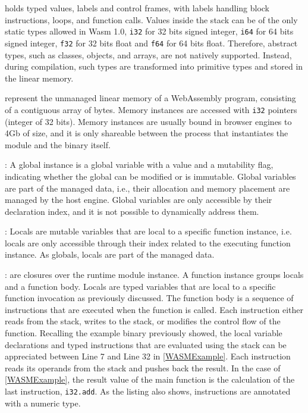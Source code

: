  holds typed values, labels and control frames, with labels handling block instructions, loops, and function calls.
Values inside the stack can be of the only static types allowed in Wasm 1.0, \texttt{i32} for 32 bits signed integer, \texttt{i64} for 64 bits signed integer, \texttt{f32} for 32 bits float and \texttt{f64} for 64 bits float.
Therefore, abstract types, such as classes, objects, and arrays, are not natively supported. 
Instead, during compilation, such types are transformed into primitive types and stored in the linear memory.

 represent the unmanaged linear memory of a WebAssembly program, consisting of a contiguous array of bytes.
Memory instances are accessed with \texttt{i32} pointers (integer of 32 bits). 
Memory instances are usually bound in browser engines to 4Gb of size, and it is only shareable between the process that instantiates the \Wasm module and the binary itself.

: A global instance is a global variable with a value and a mutability flag, indicating whether the global can be modified or is immutable.
Global variables are part of the managed data, i.e., their allocation and memory placement are managed by the host engine.
Global variables are only accessible by their declaration index, and it is not possible to dynamically address them. 


: Locals are mutable variables that are local to a specific function instance, i.e. locals are only accessible through their index related to the executing function instance. As globals, locals are part of the managed data.

: are closures over the runtime module instance.
A function instance groups locals and a function body.
Locals are typed variables that are local to a specific function invocation as previously discussed.
The function body is a sequence of instructions that are executed when the function is called.
Each instruction either reads from the stack, writes to the stack, or modifies the control flow of the function.
Recalling the example \wasm binary previously showed, 
the local variable declarations and typed instructions that are evaluated using the stack can be appreciated between Line 7 and Line 32 in \autoref{WASMExample}. 
Each instruction reads its operands from the stack and pushes back the result. 
In the case of \autoref{WASMExample}, the result value of the main function is the calculation of the last instruction, \texttt{i32.add}. 
As the listing also shows, instructions are annotated with a numeric type.


